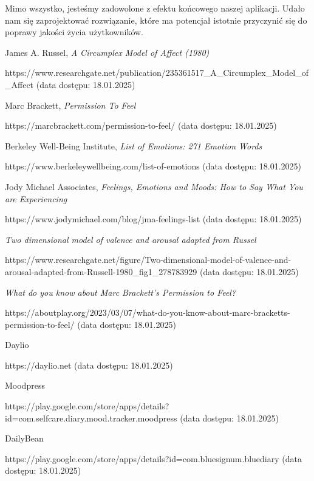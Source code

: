 \documentclass[inz, shortabstract]{iithesis}
\begin{document}
Mimo wszystko, jesteśmy zadowolone z efektu końcowego naszej aplikacji. Udało nam się zaprojektować rozwiązanie, które ma potencjał istotnie przyczynić się do poprawy jakości życia użytkowników.


\begin{thebibliography}{1}

 James A. Russel, \textit{A Circumplex Model of Affect (1980)}

https://www.researchgate.net/publication/235361517\_A\_Circumplex\_Model\_of\_Affect (data dostępu: 18.01.2025)

 Marc Brackett, \textit{Permission To Feel}

https://marcbrackett.com/permission-to-feel/ (data dostępu: 18.01.2025)

 Berkeley Well-Being Institute, \textit{List of Emotions: 271 Emotion Words}

https://www.berkeleywellbeing.com/list-of-emotions (data dostępu: 18.01.2025)

 Jody Michael Associates, \textit{Feelings, Emotions and Moods: How to Say What You are Experiencing}

https://www.jodymichael.com/blog/jma-feelings-list (data dostępu: 18.01.2025)

 \textit{Two dimensional model of valence and arousal adapted from Russel}

https://www.researchgate.net/figure/Two-dimensional-model-of-valence-and-arousal-adapted-from-Russell-1980\_fig1\_278783929 (data dostępu: 18.01.2025)

 \textit{What do you know about Marc Brackett’s Permission to Feel?}

https://aboutplay.org/2023/03/07/what-do-you-know-about-marc-bracketts-permission-to-feel/ (data dostępu: 18.01.2025) 

 Daylio

https://daylio.net (data dostępu: 18.01.2025) 

 Moodpress

https://play.google.com/store/apps/details?id=com.selfcare.diary.mood.tracker.moodpress (data dostępu: 18.01.2025) 

 DailyBean

https://play.google.com/store/apps/details?id=com.bluesignum.bluediary (data dostępu: 18.01.2025) 


\end{thebibliography}
\end{document}
